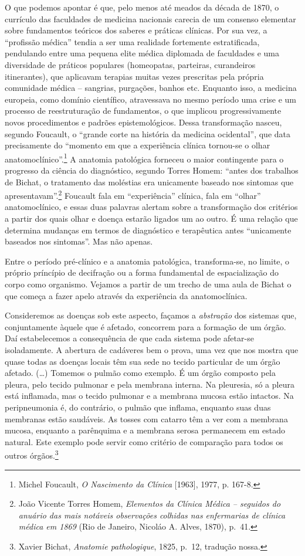 O que podemos apontar é que, pelo menos até meados da década de 1870, o
currículo das faculdades de medicina nacionais carecia de um consenso
elementar sobre fundamentos teóricos dos saberes e práticas clínicas.
Por sua vez, a ``profissão médica'' tendia a ser uma realidade
fortemente estratificada, pendulando entre uma pequena elite médica
diplomada de faculdades e uma diversidade de práticos populares
(homeopatas, parteiras, curandeiros itinerantes), que aplicavam terapias
muitas vezes prescritas pela própria comunidade médica -- sangrias,
purgações, banhos etc. Enquanto isso, a medicina europeia, como domínio
científico, atravessava no mesmo período uma crise e um processo de
reestruturação de fundamentos, o que implicou progressivamente novos
procedimentos e padrões epistemológicos. Dessa transformação nasceu,
segundo Foucault, o ``grande corte na história da medicina ocidental'',
que data precisamente do ``momento em que a experiência clínica
tornou-se o olhar anatomoclínico''.\footnote{Michel Foucault, \emph{O
  Nascimento da Clínica} {[}1963{]}, 1977, p. 167-8.} A anatomia
patológica forneceu o maior contingente para o progresso da ciência do
diagnóstico, segundo Torres Homem: ``antes dos trabalhos de Bichat, o
tratamento das moléstias era unicamente baseado nos sintomas que
apresentavam''.\footnote{João Vicente Torres Homem, \emph{Elementos da
  Clínica Médica -- seguidos do anuário das mais notáveis observações
  colhidas nas enfermarias de clínica médica em 1869} (Rio de Janeiro,
  Nicoláo A. Alves, 1870), p.~41.} Foucault fala em ``experiência''
clínica, fala em ``olhar'' anatomoclínico, e essas duas palavras alertam
sobre a transformação dos critérios a partir dos quais olhar e doença
estarão ligados um ao outro. É uma relação que determina mudanças em
termos de diagnóstico e terapêutica antes ``unicamente baseados nos
sintomas''. Mas não apenas.

Entre o período pré-clínico e a anatomia patológica, transforma-se, no
limite, o próprio príncípio de decifração ou a forma fundamental de
espacialização do corpo como organismo. Vejamos a partir de um trecho de
uma aula de Bichat o que começa a fazer apelo através da experiência da
anatomoclínica.

Consideremos as doenças sob este aspecto, façamos a \emph{abstração} dos
sistemas que, conjuntamente àquele que é afetado, concorrem para a
formação de um órgão. Daí estabelecemos a consequência de que cada
sistema pode afetar-se isoladamente. A abertura de cadáveres bem o
prova, uma vez que nos mostra que quase todas as doenças locais têm sua
sede no tecido particular de um órgão afetado. (\ldots{}) Tomemos o
pulmão como exemplo. É um órgão composto pela pleura, pelo tecido
pulmonar e pela membrana interna. Na pleuresia, só a pleura está
inflamada, mas o tecido pulmonar e a membrana mucosa estão intactos. Na
peripneumonia é, do contrário, o pulmão que inflama, enquanto suas duas
membranas estão saudáveis. As tosses com catarro têm a ver com a
membrana mucosa, enquanto a parênquima e a membrana serosa permanecem em
estado natural. Este exemplo pode servir como critério de comparação
para todos os outros órgãos.\footnote{Xavier Bichat, \emph{Anatomie
  pathologique}, 1825, p.~12, tradução nossa.}

